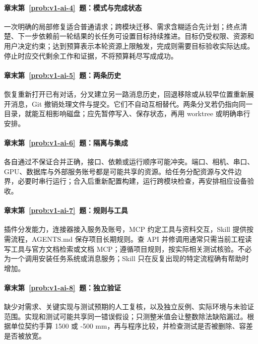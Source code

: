\paragraph*{章末第~\ref{prob:v1-ai-4}~题：模式与完成状态}
\begin{solution}
一次明确的局部修复适合普通请求；跨模块迁移、需求含糊适合先计划；终点清楚、下一步依赖前一轮结果的长任务可设置目标持续推进。目标仍受权限、资源和用户决定约束；达到预算表示本轮资源上限触发，完成则需要目标验收实际达成。停止时应交代剩余工作和证据，不将预算耗尽写成成功。
\end{solution}

\paragraph*{章末第~\ref{prob:v1-ai-5}~题：两条历史}
\begin{solution}
恢复重新打开已有对话，分叉建立另一路消息历史，回退移除或从较早位置重新展开消息，Git 撤销处理文件与提交。它们不自动互相替代。两条分叉若仍指向同一目录，就能互相影响磁盘；应先暂停写入、保存状态，再用 worktree 或明确串行安排。
\end{solution}

\paragraph*{章末第~\ref{prob:v1-ai-6}~题：隔离与集成}
\begin{solution}
各自通过不保证合并正确，接口、依赖或运行顺序可能冲突。端口、相机、串口、GPU、数据库与外部服务账号都是可能共享的资源。给任务分配资源与文件边界，必要时串行运行；合入后重新配置构建，运行跨模块检查，再安排相应设备验收。
\end{solution}

\paragraph*{章末第~\ref{prob:v1-ai-7}~题：规则与工具}
\begin{solution}
插件分发能力，连接器接入服务及账号，MCP 约定工具与资料交互，Skill 提供按需流程，AGENTS.md 保存项目长期规则。查 API 并修调用通常只需当前工程读写工具与官方文档检索或文档 MCP；遵循项目规则，按实际相关测试核验。不必为一个调用安装任务系统或消息服务；Skill 只在反复出现的特定流程确有帮助时增加。
\end{solution}

\paragraph*{章末第~\ref{prob:v1-ai-8}~题：独立验证}
\begin{solution}
缺少对需求、关键实现与测试预期的人工复核，以及独立反例、实际环境与未验证范围。实现和测试可能共享同一错误假设；只测整米值会让整数除法缺陷漏过。根据单位契约手算 1500 或 -500 mm，再与程序比较，并检查测试是否被删除、容差是否被放宽。
\end{solution}

